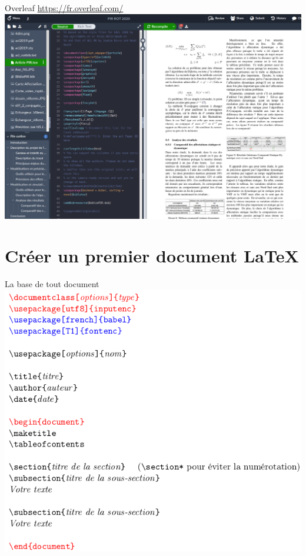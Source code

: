 \documentclass[handout]{beamer}
\begin{document}
\begin{frame}{Overleaf}
	\centering \url{https://fr.overleaf.com/}
	\includegraphics[scale=0.18]{ressources/overleaf.png}
\end{frame}
\section{Créer un premier document \LaTeX}
\begin{frame}{La base de tout document}
	\vspace*{-0.3cm}
	\includegraphics[scale=0.35]{ressources/basedoc}	
\end{frame}
\end{document}
